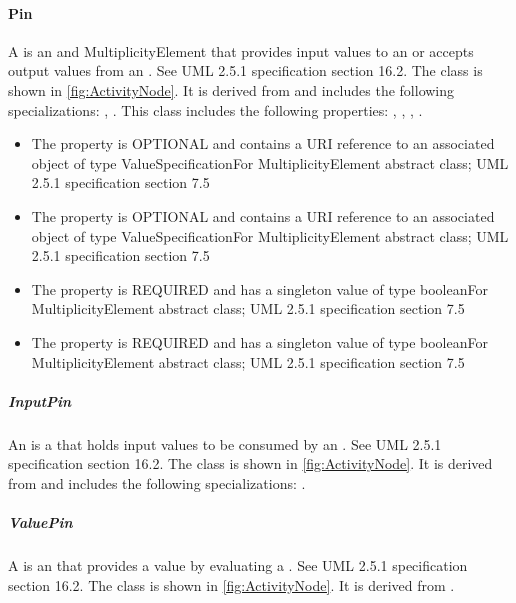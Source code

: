\paragraph{Pin}%
\label{sec:uml:Pin}%
A  is an  and MultiplicityElement that provides input values to an  or accepts output values from an . See UML 2.5.1 specification section 16.2.%
\newline%
\linebreak%
The  class is shown in \ref{fig:ActivityNode}. It is derived from  and includes the following specializations: , . %
This class includes the following properties: , , , . %
\begin{itemize}%
\item%
The  property is OPTIONAL and contains a URI reference to an associated object of type ValueSpecificationFor MultiplicityElement abstract class; UML 2.5.1 specification section 7.5%
\item%
The  property is OPTIONAL and contains a URI reference to an associated object of type ValueSpecificationFor MultiplicityElement abstract class; UML 2.5.1 specification section 7.5%
\item%
The  property is REQUIRED and has a singleton value of type booleanFor MultiplicityElement abstract class; UML 2.5.1 specification section 7.5%
\item%
The  property is REQUIRED and has a singleton value of type booleanFor MultiplicityElement abstract class; UML 2.5.1 specification section 7.5%
\end{itemize}%
\subparagraph{InputPin}%
\label{sec:uml:InputPin}%
An  is a  that holds input values to be consumed by an . See UML 2.5.1 specification section 16.2.%
\newline%
\linebreak%
The  class is shown in \ref{fig:ActivityNode}. It is derived from  and includes the following specializations: . %
%
\subparagraph{ValuePin}%
\label{sec:uml:ValuePin}%
A  is an  that provides a value by evaluating a . See UML 2.5.1 specification section 16.2.%
\newline%
\linebreak%
The  class is shown in \ref{fig:ActivityNode}. It is derived from .%
